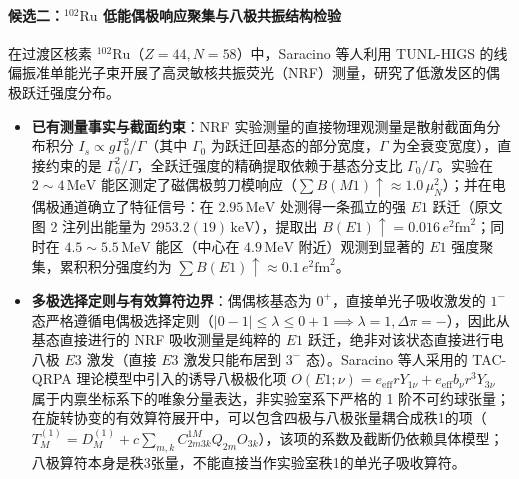 \paragraph{候选二：$^{102}\mathrm{Ru}$ 低能偶极响应聚集与八极共振结构检验}
在过渡区核素 $^{102}\mathrm{Ru}$（$Z=44, N=58$）中，Saracino 等人利用 TUNL-HIGS 的线偏振准单能光子束开展了高灵敏核共振荧光（NRF）测量，研究了低激发区的偶极跃迁强度分布。\cite{saracino-2026-102ru-scissors-octupole-resonances}
\begin{itemize}
\item \textbf{已有测量事实与截面约束}：NRF 实验测量的直接物理观测量是散射截面角分布积分 $I_s \propto g \Gamma_0^2 / \Gamma$（其中 $\Gamma_0$ 为跃迁回基态的部分宽度，$\Gamma$ 为全衰变宽度），直接约束的是 $\Gamma_0^2/\Gamma$，全跃迁强度的精确提取依赖于基态分支比 $\Gamma_0/\Gamma$。实验在 $2\sim 4\,\mathrm{MeV}$ 能区测定了磁偶极剪刀模响应（$\sum B(M1)\!\uparrow \approx 1.0\,\mu_N^2$）；并在电偶极通道确立了特征信号：在 $2.95\,\mathrm{MeV}$ 处测得一条孤立的强 $E1$ 跃迁（原文图 2 注列出能量为 $2953.2(19)\,\mathrm{keV}$），提取出 $B(E1)\!\uparrow = 0.016\,e^2\mathrm{fm}^2$；同时在 $4.5\sim 5.5\,\mathrm{MeV}$ 能区（中心在 $4.9\,\mathrm{MeV}$ 附近）观测到显著的 $E1$ 强度聚集，累积积分强度约为 $\sum B(E1)\!\uparrow \approx 0.1\,e^2\mathrm{fm}^2$。
\item \textbf{多极选择定则与有效算符边界}：偶偶核基态为 $0^+$，直接单光子吸收激发的 $1^-$ 态严格遵循电偶极选择定则（$|0 - 1| \le \lambda \le 0 + 1 \implies \lambda = 1, \Delta\pi = -$），因此从基态直接进行的 NRF 吸收测量是纯粹的 $E1$ 跃迁，绝非对该状态直接进行电八极 $E3$ 激发（直接 $E3$ 激发只能布居到 $3^-$ 态）。Saracino 等人采用的 TAC-QRPA 理论模型中引入的诱导八极极化项 $O(E1;\nu) = e_{\mathrm{eff}} r Y_{1\nu} + e_{\mathrm{eff}} b_\nu r^3 Y_{3\nu}$ 属于内禀坐标系下的唯象分量表达，非实验室系下严格的 1 阶不可约球张量；在旋转协变的有效算符展开中，可以包含四极与八极张量耦合成秩1的项（$T_M^{(1)} = D_M^{(1)} + c \sum_{m,k} C_{2m 3k}^{1M} Q_{2m} O_{3k}$），该项的系数及截断仍依赖具体模型；八极算符本身是秩3张量，不能直接当作实验室秩1的单光子吸收算符。

\end{itemize}
